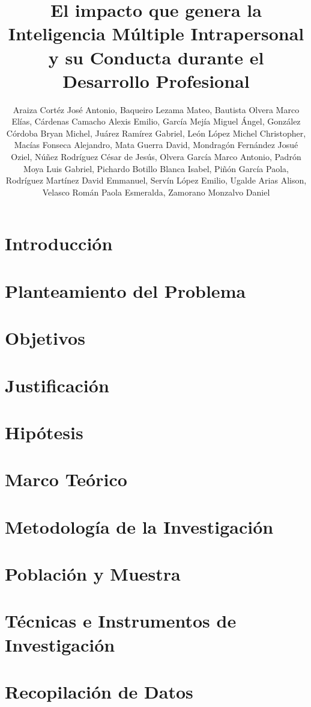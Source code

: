 \documentclass[stu,12pt]{apa7}
\affiliation{Facultad de Inform\'atica, Universidad Aut\'onoma de Quer\'etaro}
\title{El impacto que genera la Inteligencia M\'ultiple Intrapersonal y su
Conducta durante el Desarrollo Profesional}
\author{Araiza Cort\'ez Jos\'e Antonio, Baqueiro Lezama Mateo, Bautista Olvera
Marco El\'ias, C\'ardenas Camacho Alexis Emilio, Garc\'ia Mej\'ia Miguel
\'Angel, Gonz\'alez C\'ordoba Bryan Michel, Ju\'arez Ram\'irez Gabriel, Le\'on
L\'opez Michel Christopher, Mac\'ias Fonseca Alejandro, Mata Guerra David, 
Mondrag\'on Fern\'andez Josu\'e Oziel, N\'u\~nez Rodr\'iguez C\'esar de Jes\'us,
Olvera Garc\'ia Marco Antonio, Padr\'on Moya Luis Gabriel, Pichardo Botillo
Blanca Isabel, Pi\~n\'on Garc\'ia Paola, Rodr\'iguez Mart\'inez David Emmanuel,
Serv\'in L\'opez Emilio, Ugalde Arias Alison, Velasco Rom\'an Paola Esmeralda,
Zamorano Monzalvo Daniel}
\begin{document}
\maketitle
\tableofcontents
\section{Introducci\'on}

\section{Planteamiento del Problema}

\section{Objetivos}

\section{Justificaci\'on}

\section{Hip\'otesis}

\section{Marco Te\'orico}

\section{Metodolog\'ia de la Investigaci\'on}

\section{Poblaci\'on y Muestra}

\section{T\'ecnicas e Instrumentos de Investigaci\'on}

\section{Recopilaci\'on de Datos}

\end{document}
